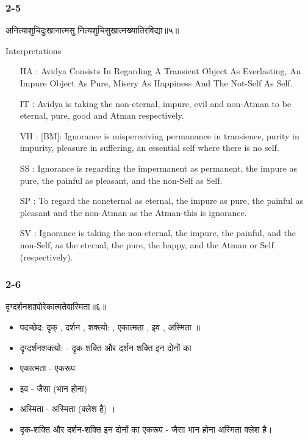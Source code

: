 \begin{frame}[fragile]\frametitle{2-5}
\begin{sanskrit}
अनित्याशुचिदुःखानात्मसु नित्यशुचिसुखात्मख्यातिरविद्या॥५॥
\end{sanskrit}

Interpretations
\begin{itemize}
\item [HA]: Avidya Consists In Regarding A Transient Object As Everlasting, An Impure Object As Pure, Misery As Happiness And The Not-Self As Self.
\item [IT]: Avidya is taking the non-eternal, impure, evil and non-Atman to be eternal, pure, good and Atman respectively.
\item [VH]: [BM]: Ignorance is misperceiving permanance in transience, purity in impurity, pleasure in suffering, an essential self where there is no self.
\item [SS]: Ignorance is regarding the impermanent as permanent, the impure as pure, the painful as pleasant, and the non-Self as Self.
\item [SP]: To regard the noneternal as eternal, the impure as pure, the painful as pleasant and the non-Atman as the Atman-this is ignorance.
\item [SV]: Ignorance is taking the non-eternal, the impure, the painful, and the non-Self, as the eternal, the pure, the happy, and the Atman or Self (respectively). 
\end{itemize}
	
\end{frame}

\begin{frame}[fragile]\frametitle{2-6}
\begin{sanskrit}
दृग्दर्शनशक्त्योरेकात्मतेवास्मिता॥६॥
\end{sanskrit}

	\begin{itemize}
	\item पदच्छेद: दृक् , दर्शन , शक्त्यो: , एकात्मता , इव , अस्मिता ॥
	\item दृग्दर्शनशक्त्यो: - दृक-शक्ति और दर्शन-शक्ति इन दोनों का
	\item एकात्मता - एकरूप
	\item इव - जैसा (भान होना)
	\item अस्मिता - अस्मिता (क्लेश है) ।	
	\item दृक-शक्ति और दर्शन-शक्ति इन दोनों का एकरूप - जैसा भान होना अस्मिता क्लेश है।
	\end{itemize}
	
\end{frame}


